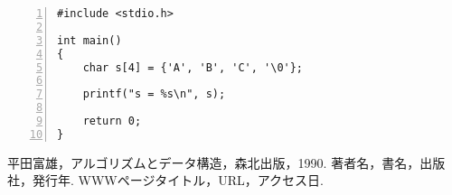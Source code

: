 \begin{Verbatim}[numbers=left, xleftmargin=10mm, numbersep=6pt,
                    fontsize=\small, baselinestretch=0.8]
#include <stdio.h>

int main()
{
    char s[4] = {'A', 'B', 'C', '\0'};

    printf("s = %s\n", s);

    return 0;
}
\end{Verbatim}

\begin{thebibliography}{99}
   平田富雄，アルゴリズムとデータ構造，森北出版，1990.
   著者名，書名，出版社，発行年.
   WWWページタイトル，URL，アクセス日.
\end{thebibliography}



